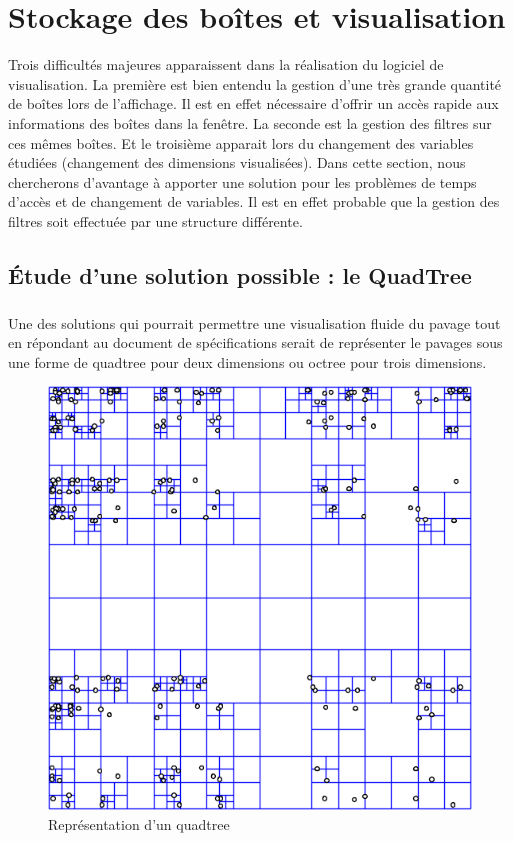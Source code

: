 \chapter{Stockage des boîtes et visualisation}
Trois difficultés majeures apparaissent dans la réalisation du logiciel de visualisation. La première est bien entendu la gestion d'une très grande quantité de boîtes lors de l'affichage. Il est en effet nécessaire d'offrir un accès rapide aux informations des boîtes dans la fenêtre. La seconde est la gestion des filtres sur ces mêmes boîtes. Et le troisième apparait lors du changement des variables étudiées (changement des dimensions visualisées). Dans cette section, nous chercherons d'avantage à apporter une solution pour les problèmes de temps d'accès et de changement de variables. Il est en effet probable que la gestion des filtres soit effectuée par une structure différente.

\section{\'Etude d'une solution possible : le QuadTree}
\paragraph{}Une des solutions qui pourrait permettre une visualisation fluide du pavage tout en répondant au document de spécifications serait de représenter le pavages sous une forme de quadtree pour deux dimensions ou octree pour trois dimensions.
\begin{figure}[htbp]
\centering
\includegraphics[scale=0.50]{quadtree}
\caption{Représentation d'un quadtree}
\end{figure}

